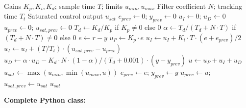 \begin{algorithm}[htbp]
\caption{Industrial Digital PID Controller}
\label{alg:industrial_pid}
\begin{algorithmic}[1]
\REQUIRE Gains $K_p, K_i, K_d$; sample time $T$; limits $u_{min}, u_{max}$
\REQUIRE Filter coefficient $N$; tracking time $T_t$
\ENSURE Saturated control output $u_{sat}$
\STATE {}
\STATE $e_{prev} \gets 0$; $y_{prev} \gets 0$
\STATE $u_I \gets 0$; $u_D \gets 0$
\STATE $u_{prev} \gets 0$; $u_{sat,prev} \gets 0$
\STATE $T_d \gets K_d / K_p$ if $K_p \neq 0$ else $0$
\STATE $\alpha \gets T_d / (T_d + N \cdot T)$ if $(T_d + N \cdot T) \neq 0$ else $0$
\STATE
\STATE {}
    \STATE $e \gets r - y$
    \STATE {}
    \STATE $u_P \gets K_p \cdot e$
    \STATE {}
    \STATE $u_I \gets u_I + K_i \cdot T \cdot (e + e_{prev})/2$
    \STATE $u_I \gets u_I + (T / T_t) \cdot (u_{sat,prev} - u_{prev})$
    \STATE {}
    \STATE $u_D \gets \alpha \cdot u_D - K_d \cdot N \cdot (1 - \alpha) / (T_d + 0.001) \cdot (y - y_{prev})$
    \STATE {}
    \STATE $u \gets u_P + u_I + u_D$
    \STATE {}
    \STATE $u_{sat} \gets \max(u_{min}, \min(u_{max}, u))$
    \STATE {}
    \STATE $e_{prev} \gets e$; $y_{prev} \gets y$
    \STATE $u_{prev} \gets u$; $u_{sat,prev} \gets u_{sat}$
    \RETURN $u_{sat}$
\ENDPROCEDURE
\end{algorithmic}
\end{algorithm}

\textbf{Complete Python class:}

